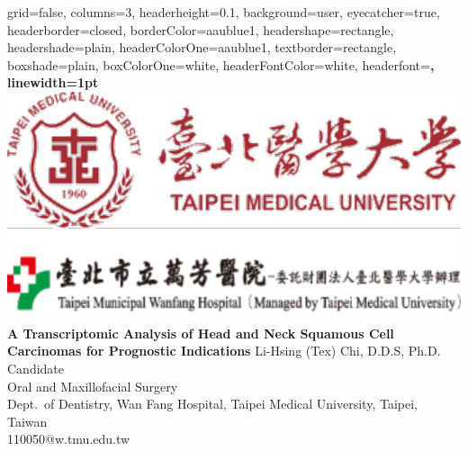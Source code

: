 \documentclass[paperwidth=78cm,paperheight=110cm,portrait]{baposter}
\begin{document}
\begin{poster}{
  grid=false,
  columns=3,
  headerheight=0.1\textheight,
  background=user,
  eyecatcher=true,
  headerborder=closed,
  borderColor=aaublue1,
  headershape=rectangle,
  headershade=plain,
  headerColorOne=aaublue1,
  textborder=rectangle,
  boxshade=plain,
  boxColorOne=white,
  headerFontColor=white,
  headerfont=\Large\sf\bf,
  linewidth=1pt
}
{
  \includegraphics[height=0.55\headerheight]{TMU_TMWH_logo.pdf} %
}
{\color{white}\bf
  \Large A Transcriptomic Analysis of Head and Neck Squamous Cell Carcinomas for Prognostic Indications
}
{\color{white}\small
  \vspace{1em} Li-Hsing (Tex) Chi, D.D.S, Ph.D. Candidate \\[0.5em] %
  Oral and Maxillofacial Surgery \\
  Dept.\ of Dentistry, Wan Fang Hospital, Taipei Medical University, Taipei, Taiwan\\
  110050@w.tmu.edu.tw
}
{
}
\end{poster}
\end{document}
